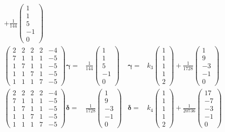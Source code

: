 \documentclass[12pt,b5paper]{ltjsarticle}
\begin{document}
\begin{enumerate}
\begin{align}
       +\frac{1}{144}\begin{pmatrix}1\\1\\5\\-1\\0\end{pmatrix}\\
       \begin{pmatrix}
        2 & 2 & 2 & 2 & -4\\
        7 & 1 & 1 & 1 & -5\\
        1 & 7 & 1 & 1 & -5\\
        1 & 1 & 7 & 1 & -5\\
        1 & 1 & 1 & 7 & -5
       \end{pmatrix}
       \bm{\gamma}=&\frac{1}{144}\begin{pmatrix}1\\1\\5\\-1\\0\end{pmatrix}
       &
       \bm{\gamma}=&k_3\begin{pmatrix}1\\1\\1\\1\\2\end{pmatrix}
       +\frac{1}{1728}\begin{pmatrix}1\\9\\-3\\-1\\0\end{pmatrix}\\
       \begin{pmatrix}
        2 & 2 & 2 & 2 & -4\\
        7 & 1 & 1 & 1 & -5\\
        1 & 7 & 1 & 1 & -5\\
        1 & 1 & 7 & 1 & -5\\
        1 & 1 & 1 & 7 & -5
       \end{pmatrix}
       \bm{\delta}=&\frac{1}{1728}\begin{pmatrix}1\\9\\-3\\-1\\0\end{pmatrix}
       &
       \bm{\delta}=&k_4\begin{pmatrix}1\\1\\1\\1\\2\end{pmatrix}
       +\frac{1}{20736}\begin{pmatrix}17\\-7\\-3\\-1\\0\end{pmatrix}
      \end{align}




\end{enumerate}
\end{document}
